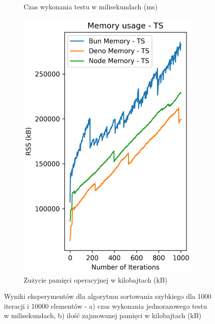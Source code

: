 \begin{figure}[H]
\begin{subfigure}[b]{0.44\textwidth}
    \caption{Czas wykonania testu w milisekundach (ms)}
    \label{fig:quick_sorting_e4_ts_time}
  \end{subfigure}
  \begin{subfigure}[b]{0.44\textwidth}
    \centering
    \includegraphics[width=\textwidth]{Figures/sorting/sorting_quick_1000_10000_ts_memory.png}
    \caption{Zużycie pamięci operacyjnej w kilobajtach (kB)}
    \label{fig:quick_sorting_e4_ts_memory}
  \end{subfigure}
  \caption{Wyniki eksperymentów dla algorytmu sortowania szybkiego dla 1000 iteracji i 10000 elementów - a) czas wykonania jednorazowego testu w milisekundach, b) ilość zajmowanej pamięci w kilobajtach (kB)}
  \label{fig:quick_sorting_e4_ts}
\end{figure}

